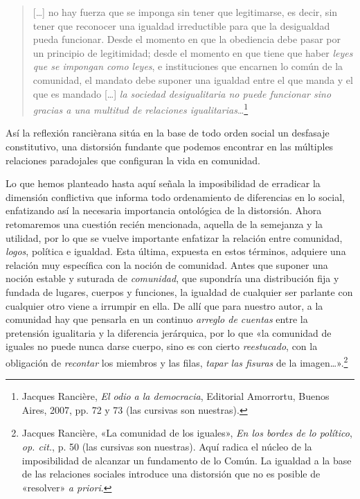 \begin{quote}
{[}\ldots{]} no hay fuerza que se imponga sin tener que legitimarse, es decir, sin tener que reconocer una igualdad irreductible para que la desigualdad pueda funcionar. Desde el momento en que la obediencia debe pasar por un principio de legitimidad; desde el momento en que tiene que haber \emph{leyes que se impongan como leyes}, e instituciones que encarnen lo común de la comunidad, el mandato debe suponer una igualdad entre el que manda y el que es mandado {[}\ldots{]} \emph{la sociedad desigualitaria no puede funcionar sino gracias a una multitud de relaciones igualitarias}\ldots{}\footnote{Jacques Rancière, \emph{El odio a la democracia}, Editorial Amorrortu, Buenos Aires, 2007, pp. 72 y 73 (las cursivas son nuestras).}
\end{quote}

Así la reflexión rancièrana sitúa en la base de todo orden social un desfasaje constitutivo, una distorsión fundante que podemos encontrar en las múltiples relaciones paradojales que configuran la vida en comunidad.

Lo que hemos planteado hasta aquí señala la imposibilidad de erradicar la dimensión conflictiva que informa todo ordenamiento de diferencias en lo social, enfatizando así la necesaria importancia ontológica de la distorsión. Ahora retomaremos una cuestión recién mencionada, aquella de la semejanza y la utilidad, por lo que se vuelve importante enfatizar la relación entre comunidad, \emph{logos}, política e igualdad. Esta última, expuesta en estos términos, adquiere una relación muy específica con la noción de comunidad. Antes que suponer una noción estable y suturada de \emph{comunidad}, que supondría una distribución fija y fundada de lugares, cuerpos y funciones, la igualdad de cualquier ser parlante con cualquier otro viene a irrumpir en ella. De allí que para nuestro autor, a la comunidad hay que pensarla en un continuo \emph{arreglo de cuentas} entre la pretensión igualitaria y la diferencia jerárquica, por lo que «la comunidad de iguales no puede nunca darse cuerpo, sino es con cierto \emph{reestucado}, con la obligación de \emph{recontar} los miembros y las filas, \emph{tapar las fisuras} de la imagen\ldots».\footnote{Jacques Rancière, «La comunidad de los iguales», \emph{En los bordes de lo político}, \emph{op. cit.}, p. 50 (las cursivas son nuestras). Aquí radica el núcleo de la imposibilidad de alcanzar un fundamento de lo Común. La igualdad a la base de las relaciones sociales introduce una distorsión que no es posible de «resolver» \emph{a priori}.}

